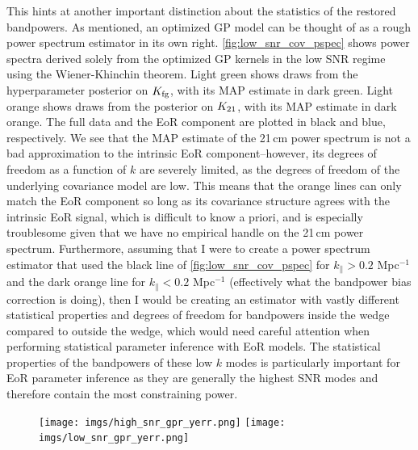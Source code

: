 \documentclass[a4paper,fleqn,usenatbib]{mnras}
\def\para{\parallel}
\def\Kto{K_{\rm 21}}
\def\Kfg{K_{\rm fg}}
\begin{document}
This hints at another important distinction about the statistics of the restored bandpowers.
As mentioned, an optimized GP model can be thought of as a rough power spectrum estimator in its own right.
\autoref{fig:low_snr_cov_pspec} shows power spectra derived solely from the optimized GP kernels in the low SNR regime using the Wiener-Khinchin theorem.
Light green shows draws from the hyperparameter posterior on $\Kfg$, with its MAP estimate in dark green.
Light orange shows draws from the posterior on $\Kto$, with its MAP estimate in dark orange.
The full data and the EoR component are plotted in black and blue, respectively.
We see that the MAP estimate of the 21\,cm power spectrum is not a bad approximation to the intrinsic EoR component--however, its degrees of freedom as a function of $k$ are severely limited, as the degrees of freedom of the underlying covariance model are low.
This means that the orange lines can only match the EoR component so long as its covariance structure agrees with the intrinsic EoR signal, which is difficult to know a priori, and is especially troublesome given that we have no empirical handle on the 21\,cm power spectrum.
Furthermore, assuming that I were to create a power spectrum estimator that used the black line of \autoref{fig:low_snr_cov_pspec} for $k_\para > 0.2$ Mpc$^{-1}$ and the dark orange line for $k_\para < 0.2$ Mpc$^{-1}$ (effectively what the bandpower bias correction is doing), then I would be creating an estimator with vastly different statistical properties and degrees of freedom for bandpowers inside the wedge compared to outside the wedge, which would need careful attention when performing statistical parameter inference with EoR models.
The statistical properties of the bandpowers of these low $k$ modes is particularly important for EoR parameter inference as they are generally the highest SNR modes and therefore contain the most constraining power.

\begin{figure}
\centering
\texttt{[image: imgs/high\_snr\_gpr\_yerr.png]}
\texttt{[image: imgs/low\_snr\_gpr\_yerr.png]}
\caption{}
\label{fig:gpr_yerr}
\end{figure}
\end{document}

